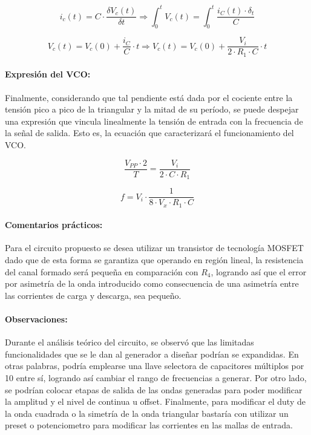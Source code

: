 \begin{equation*}
    i_c(t) = C \cdot \frac{\delta V_c(t)}{\delta t} \Rightarrow \int_0^{t} V_c(t) = \int_0^{t} \frac{i_C(t) \cdot \delta_t}{C}
\end{equation*}

\begin{equation}
    V_c(t) = V_c(0) + \frac{i_C}{C} \cdot t \Rightarrow V_c(t) = V_c(0) + \frac{V_i}{2 \cdot R_1 \cdot C} \cdot t
\end{equation}

\paragraph{Expresi\'on del VCO:} Finalmente, considerando que tal pendiente est\'a dada por el cociente entre la tensi\'on pico a pico
de la triangular y la mitad de su per\'iodo, se puede despejar una expresi\'on que vincula linealmente la tensi\'on de entrada con la frecuencia de la se\~nal de salida. Esto es, la ecuaci\'on que caracterizar\'a el funcionamiento
del VCO.

\begin{equation*}
    \frac{V_{PP} \cdot 2}{T} = \frac{V_i}{2 \cdot C \cdot R_1}
\end{equation*}

\begin{equation}
    f = V_i \cdot \frac{1}{8 \cdot V_x \cdot R_1 \cdot C}
    \label{eq:ecuacion_caracteristica_vco}
\end{equation}

\paragraph{Comentarios pr\'acticos:} Para el circuito propuesto se desea utilizar un transistor de tecnolog\'ia MOSFET dado que de esta forma se garantiza que operando en regi\'on lineal,
la resistencia del canal formado ser\'a peque\~na en comparaci\'on con $R_4$, logrando as\'i que el error por asimetr\'ia de la onda introducido como consecuencia de una asimetr\'ia entre las corrientes
de carga y descarga, sea peque\~no.

\paragraph{Observaciones:} Durante el an\'alisis te\'orico del circuito, se observ\'o que las limitadas funcionalidades que se le dan al generador a dise\~nar podr\'ian se expandidas. En otras palabras,
podr\'ia emplearse una llave selectora de capacitores m\'ultiplos por 10 entre s\'i, logrando as\'i cambiar el rango de frecuencias a generar. Por otro lado, se podr\'ian colocar etapas de salida de las ondas
generadas para poder modificar la amplitud y el nivel de continua u offset. Finalmente, para modificar el duty de la onda cuadrada o la simetr\'ia de la onda triangular bastar\'ia
con utilizar un preset o potenciometro para modificar las corrientes en las mallas de entrada.


